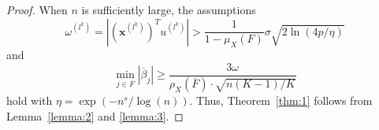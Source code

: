 \documentclass[11pt,review,authoryear]{elsarticle}
\begin{document}
\begin{appendices}
\begin{proof}
  When $n$ is sufficiently large, the assumptions
  \[
      \omega^{\left(l^k \right)} = \left\vert \left( \mathbf{x}^{\left( l^k \right)}\right) ^T u^{\left(l^{k}\right)} \right\vert >\frac{1}{1-\mu_{X}\left(F\right)}\sigma\sqrt{2\ln\left(4p/\eta\right)}
  \]
  and
  \[
      \min_{j\in\overline{F}}\left|\overline{\beta}_{j}\right|\geqslant\frac{3\omega}{\rho_{X}\left(\overline{F}\right)\cdot\sqrt{n\left(K-1\right)/K}}
  \]
  hold with $\eta = \exp\left(-n^s/\log(n)\right)$. Thus, Theorem~\ref{thm:1} follows from Lemma~\ref{lemma:2} and \ref{lemma:3}.
\end{proof}


\end{appendices}
\end{document}
